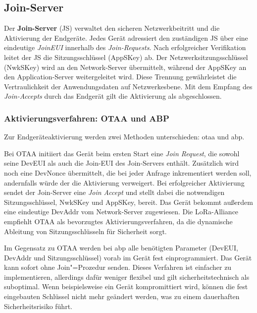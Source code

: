 \subsection{Join-Server}

Der \textbf{Join-Server} (JS) verwaltet den sicheren Netzwerkbeitritt und die Aktivierung der Endgeräte. 
Jedes Gerät adressiert den zuständigen JS über eine eindeutige \emph{JoinEUI} innerhalb des \emph{Join-Requests}. 
Nach erfolgreicher Verifikation leitet der JS die Sitzungsschlüssel (\acrshort{AppSKey}) ab. 
Der Netzwerksitzungsschlüssel (\acrshort{NwkSKey}) wird an den Network-Server übermittelt, während der AppSKey
an den Application-Server weitergeleitet wird. Diese Trennung gewährleistet die Vertraulichkeit der 
Anwendungsdaten auf Netzwerkesbene. Mit dem Empfang des \emph{Join-Accepts} durch das Endgerät gilt 
die Aktivierung als abgeschlossen. %

\subsubsection*{Aktivierungsverfahren: OTAA und ABP}
\label{subsec:aktivierung}

Zur Endgeräteaktivierung werden zwei Methoden unterschieden: \acrfull{otaa} und \acrfull{abp}.

Bei OTAA initiiert das Gerät beim ersten Start eine \textit{Join Request}, die sowohl seine \acrshort{DevEUI}
als auch die Join-EUI des Join-Servers enthält. Zusätzlich wird noch eine DevNonce übermittelt, die bei jeder Anfrage
inkrementiert werden soll, andernfalls würde der die Aktivierung verweigert. Bei erfolgreicher Aktivierung sendet der 
Join-Server eine \textit{Join Accept} und stellt dabei die notwendigen Sitzungsschlüssel, \acrfull{NwkSKey} und \acrfull{AppSKey}, bereit.
Das Gerät bekommt außerdem eine eindeutige \acrfull{DevAddr} vom Network-Server zugewiesen. Die LoRa-Alliance empfiehlt
OTAA als bevorzugtes Aktivierungsverfahren, da die dynamische Ableitung von Sitzungsschlüsseln für Sicherheit sorgt. 

Im Gegensatz zu OTAA werden bei \acrshort{abp} alle benötigten Parameter (\acrshort{DevEUI}, \acrshort{DevAddr} und Sitzungsschlüssel)
vorab im Gerät fest einprogrammiert. Das Gerät kann sofort ohne Join"=Prozedur senden. Dieses Verfahren ist einfacher zu implementieren, 
allerdings dafür weniger flexibel und gilt sicherheitstechnisch als suboptimal. Wenn beispielsweise ein Gerät kompromittiert wird, 
können die fest eingebauten Schlüssel nicht mehr geändert werden, was zu einem dauerhaften Sicherheitsrisiko führt.

